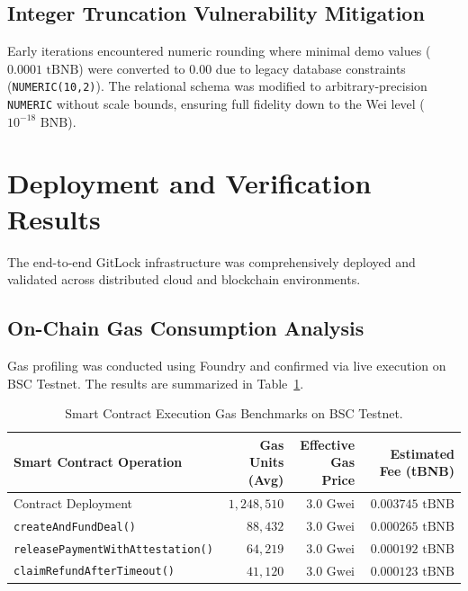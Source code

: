 \documentclass[11pt,a4paper]{article}
\begin{document}
\subsection{Integer Truncation Vulnerability Mitigation}
Early iterations encountered numeric rounding where minimal demo values ($0.0001\text{ tBNB}$) were converted to $0.00$ due to legacy database constraints (\texttt{NUMERIC(10,2)}). The relational schema was modified to arbitrary-precision \texttt{NUMERIC} without scale bounds, ensuring full fidelity down to the Wei level ($10^{-18}\text{ BNB}$).

\section{Deployment and Verification Results}
The end-to-end GitLock infrastructure was comprehensively deployed and validated across distributed cloud and blockchain environments.

\subsection{On-Chain Gas Consumption Analysis}
Gas profiling was conducted using Foundry and confirmed via live execution on BSC Testnet. The results are summarized in Table~\ref{tab:gas_analysis}.

\begin{table}[H]
\centering
\small
\begin{tabular}{lrrr}
\toprule
\textbf{Smart Contract Operation} & \textbf{Gas Units (Avg)} & \textbf{Effective Gas Price} & \textbf{Estimated Fee (tBNB)} \\
\midrule
Contract Deployment & $1,248,510$ & $3.0\text{ Gwei}$ & $0.003745\text{ tBNB}$ \\
\texttt{createAndFundDeal()} & $88,432$ & $3.0\text{ Gwei}$ & $0.000265\text{ tBNB}$ \\
\texttt{releasePaymentWithAttestation()} & $64,219$ & $3.0\text{ Gwei}$ & $0.000192\text{ tBNB}$ \\
\texttt{claimRefundAfterTimeout()} & $41,120$ & $3.0\text{ Gwei}$ & $0.000123\text{ tBNB}$ \\
\bottomrule
\end{tabular}
\caption{Smart Contract Execution Gas Benchmarks on BSC Testnet.}
\label{tab:gas_analysis}
\end{table}
\end{document}
